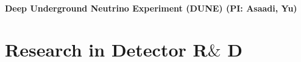 \documentclass[11pt]{article}
\def\onehead#1{\part{#1}}
\def\threehead#1{\subsection{#1}}
\begin{document}
\threehead{Deep Underground Neutrino Experiment (DUNE) (PI: Asaadi, Yu)}




\newpage

\onehead{Research in Detector R$\&$ D}






\newpage


















\end{document}

